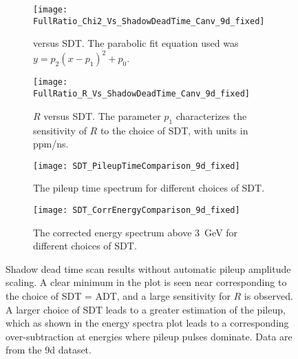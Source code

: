 \begin{figure}
\centering
    \begin{subfigure}[t]{0.45\textwidth}
        \centering
        \texttt{[image: FullRatio\_Chi2\_Vs\_ShadowDeadTime\_Canv\_9d\_fixed]}
        \caption{\chisq versus SDT. The parabolic fit equation used was $y = p_{2}(x - p_{1})^{2} + p_{0}.$}
    \end{subfigure}%
    \hspace{1cm}
    \begin{subfigure}[t]{0.45\textwidth}
        \centering
        \texttt{[image: FullRatio\_R\_Vs\_ShadowDeadTime\_Canv\_9d\_fixed]}
        \caption{$R$ versus SDT. The parameter $p_{1}$ characterizes the sensitivity of $R$ to the choice of SDT, with units in ppm/ns.}
    \end{subfigure}

    \begin{subfigure}[t]{0.45\textwidth}
        \centering
        \texttt{[image: SDT\_PileupTimeComparison\_9d\_fixed]}
        \caption{The pileup time spectrum for different choices of SDT.}
    \end{subfigure}%
    \hspace{1cm}
    \begin{subfigure}[t]{0.45\textwidth}
        \centering
        \texttt{[image: SDT\_CorrEnergyComparison\_9d\_fixed]}
        \caption{The corrected energy spectrum above \SI{3}{\GeV} for different choices of SDT.}
    \end{subfigure}
\caption[Pileup shadow dead time scan without automatic pileup amplitude scaling]{Shadow dead time scan results without automatic pileup amplitude scaling. A clear minimum in the \chisq plot is seen near  corresponding to the choice of SDT = ADT, and a large sensitivity for $R$ is observed. A larger choice of SDT leads to a greater estimation of the pileup, which as shown in the energy spectra plot leads to a corresponding over-subtraction at energies where pileup pulses dominate. Data are from the 9d dataset.}
\label{fig:SDTscan_noScaling}
\end{figure}


